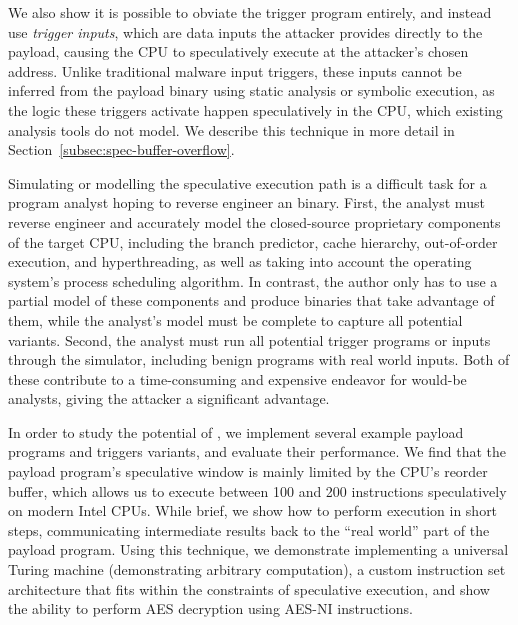 
We also show it is possible to obviate the trigger program entirely, and
instead use \emph{trigger inputs}, which are data inputs the attacker provides
directly to
the payload, causing the CPU to speculatively execute
at the attacker's chosen address. Unlike traditional malware input triggers, these inputs
cannot be inferred from the payload binary using static analysis or symbolic
execution, as the logic these triggers activate happen speculatively in the
CPU, which existing analysis tools do not model. We describe this technique in
more detail in Section~\ref{subsec:spec-buffer-overflow}.

Simulating or modelling the speculative execution path is a difficult task for a
program analyst hoping to reverse engineer an \speculake binary. First, the
analyst must reverse engineer and accurately model the closed-source proprietary
components of the target CPU, including the branch predictor, cache hierarchy,
out-of-order execution, and hyperthreading, as well as taking into account the
operating system's process scheduling algorithm. In contrast, the \speculake
author only has to use a partial model of these components and produce binaries
that take advantage of them, while the analyst's model must be complete to
capture all potential \speculake variants. Second, the analyst must run all
potential trigger programs or inputs through the simulator, including benign
programs with real world inputs. Both of these contribute to a time-consuming and expensive
endeavor for would-be analysts, giving the attacker a significant advantage.

In order to study the potential of \speculake, we implement several example
payload programs and triggers variants, and evaluate their performance. We find
that the payload program's speculative
window is mainly limited by the CPU's reorder buffer, which
allows us to execute between 100 and 200 instructions speculatively on modern
Intel CPUs. While brief, we show how to perform execution in short steps,
communicating intermediate results back to the ``real world'' part of the
payload program. Using this technique, we demonstrate implementing a universal
Turing machine (demonstrating arbitrary computation), a custom instruction set
architecture that fits within the constraints of speculative execution, and show
the ability to perform AES decryption using AES-NI instructions.

